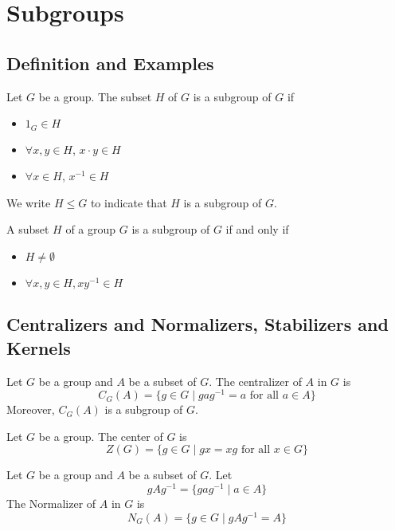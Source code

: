 \chapter{Subgroups}

\section{Definition and Examples}

\begin{definition}
  Let $G$ be a group. The subset $H$ of $G$ is a subgroup of $G$ if 
  \begin{itemize}
    \item $1_G \in H$
    \item $\forall x, y \in H$, $x \cdot y \in H$
    \item $\forall x \in H$, $x^{-1} \in H$
  \end{itemize}
  We write $H \leq G$ to indicate that $H$ is a subgroup of $G$.
\end{definition}

\begin{proposition}
  A subset $H$ of a group $G$ is a subgroup of $G$ if and only if
  \begin{itemize}
    \item $H \neq \emptyset$
    \item $\forall x, y \in H, xy^{-1} \in H$
  \end{itemize}
\end{proposition}

\section{Centralizers and Normalizers, Stabilizers and Kernels}

\begin{definition}[Centralizer]
  Let $G$ be a group and $A$ be a subset of $G$.
  The centralizer of $A$ in $G$ is
  $$C_G(A) = \{g\in G \mid gag^{-1} = a \text{ for all } a \in A\}$$
  Moreover, $C_G(A)$ is a subgroup of $G$.
\end{definition}

\begin{definition}[Center]
  Let $G$ be a group.
  The center of $G$ is 
  $$Z(G) = \{g \in G \mid gx=xg \text{ for all } x \in G\}$$
\end{definition}

\begin{definition}[Normalizer]
  Let $G$ be a group and $A$ be a subset of $G$.
  Let
  $$gAg^{-1} = \{gag^{-1}\mid a\in A\}$$
  The Normalizer of $A$ in $G$ is $$N_G(A) = \{g \in G \mid gAg^{-1} = A\}$$ 
\end{definition}

